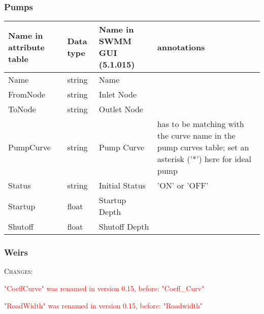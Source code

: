 \documentclass[10pt,a4paper,oneside]{scrbook}
\begin{document}
\subsubsection{Pumps}
\begin{tabular}{p{1.7cm}|p{1.3cm}|P{3cm}|P{8cm}}
\hline 
\textbf{Name in attribute table} & \textbf{Data type} & \textbf{Name in SWMM GUI (5.1.015)} & \textbf{annotations}\\ 
\hline 
Name & string & Name & \\
FromNode & string & Inlet Node & \\ 
ToNode & string & Outlet Node&  \\ 
PumpCurve & string & Pump Curve & has to be matching with the curve name in the pump curves table; set an asterisk ('*') here for ideal pump \\
Status & string & Initial Status & 'ON' or 'OFF' \\
Startup & float & Startup Depth& \\
Shutoff & float & Shutoff Depth & \\
\hline
\end{tabular}

\newpage
\subsubsection{Weirs}
\textsc{Changes}:

\textcolor{red}{"CoeffCurve" was renamed in version 0.15, before: "Coeff\_Curv"}

\textcolor{red}{"RoadWidth" was renamed in version 0.15, before: "Roadwidth"}
\end{document}
